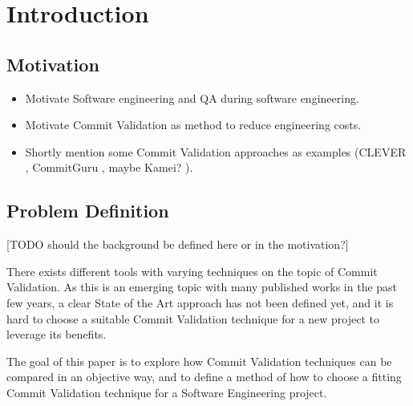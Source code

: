 \section{Introduction}

\subsection{Motivation}
\begin{itemize}
	\item Motivate Software engineering and QA during software engineering.
	\item Motivate Commit Validation as method to reduce engineering costs.
	\item Shortly mention some Commit Validation approaches as examples (CLEVER \cite{Nayrolles2018}, CommitGuru \cite{Rosen2015}, maybe Kamei? \cite{Kamei2013}).
\end{itemize}

\subsection{Problem Definition}

[TODO should the background be defined here or in the motivation?]

There exists different tools with varying techniques on the topic of Commit Validation. As this is an emerging topic with many published works in the past few years, a clear State of the Art approach has not been defined yet, and it is hard to choose a suitable Commit Validation technique for a new project to leverage its benefits. 

The goal of this paper is to explore how Commit Validation techniques can be compared in an objective way, and to define a method of how to choose a fitting Commit Validation technique for a Software Engineering project.

